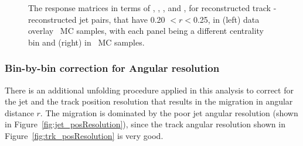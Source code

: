 \begin{figure}
\begin{subfigure}{0.30\textwidth}
\caption{}
\label{fig:pp_ChPS_respmatrix}
\end{subfigure}
\caption{The response matrices in terms of \ptjetreco, \ptjettruth, \pttrkreco, and \pttrktruth, for reconstructed track - reconstructed jet pairs, that have 0.20 $< r < $0.25, in (left) data overlay \pbpb\ MC samples, with each panel being a different centrality bin and (right) in \pp\ MC samples.}
\label{fig:ChPS_respmatrix}
\end{figure}


\subsubsection{Bin-by-bin correction for Angular resolution}
\label{sec:bbbcorrection}

There is an additional unfolding procedure applied in this analysis to correct for the jet and the track position resolution that results in the migration in angular distance $r$.
The migration is dominated by the poor jet angular resolution (shown in Figure~\ref{fig:jet_posResolution}), since the track angular resolution shown in Figure~\ref{fig:trk_posResolution} is very good.

